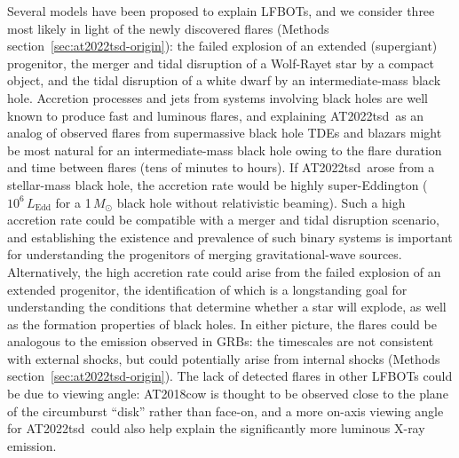 \documentclass{nature_plusfigure}
\newcommand{\at}{AT2022tsd}
\begin{document}
Several models have been proposed to explain LFBOTs\cite{Metzger2022}, and we consider three most likely in light of the newly discovered flares (Methods section~\ref{sec:at2022tsd-origin}): the failed explosion of an extended (supergiant) progenitor\cite{Kashiyama2015,Perley2019,Margutti2019,Quataert2019}, the merger and tidal disruption of a Wolf-Rayet star by a compact object\cite{Metzger2022}, and the tidal disruption of a white dwarf by an intermediate-mass black hole\cite{Kuin2019,Perley2019}.
Accretion processes and jets from systems involving black holes are well known to produce fast and luminous flares,
and explaining \at\ as an analog of observed flares from supermassive black hole TDEs and blazars might be most natural for an intermediate-mass black hole owing to the flare duration and time between flares (tens of minutes to hours).
If \at\ arose from a stellar-mass black hole, the accretion rate would be highly super-Eddington ($10^{6}\,L_\mathrm{Edd}$ for a 1\,$M_\odot$ black hole without relativistic beaming). Such a high accretion rate could be compatible with a merger and tidal disruption scenario\cite{Metzger2022}, and establishing the existence and prevalence of such binary systems is important for understanding the progenitors of merging gravitational-wave sources.
Alternatively, the high accretion rate could arise from the failed explosion of an extended progenitor\cite{Woosley1993,Quataert2012,Kashiyama2015,Quataert2019}, the identification of which is a longstanding goal for understanding the conditions that determine whether a star will explode, as well as the formation properties of black holes.
In either picture, the flares could be analogous to the emission observed in GRBs: the timescales are not consistent with external shocks, but could potentially arise from internal shocks (Methods section~\ref{sec:at2022tsd-origin}).
The lack of detected flares in other LFBOTs could be due to viewing angle: AT2018cow is thought to be observed close to the plane of the circumburst ``disk'' rather than face-on\cite{Margutti2019,Chen2023}, and a more on-axis viewing angle for \at\ could also help explain the significantly more luminous X-ray emission.
\end{document}
